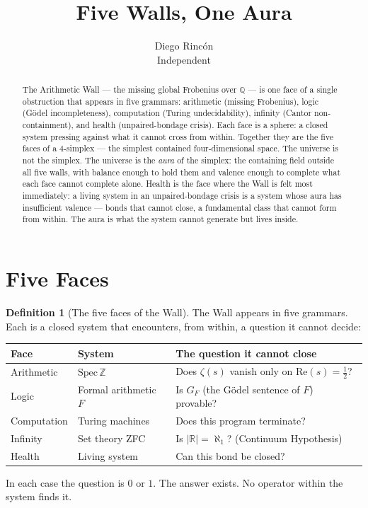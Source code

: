 \documentclass[12pt]{article}
\title{Five Walls, One Aura}
\author{Diego Rinc\'on\\
\small Independent}
\date{}
\theoremstyle{definition}
\newtheorem{definition}[theorem]{Definition}
\theoremstyle{remark}
\begin{document}
\maketitle

\begin{abstract}
The Arithmetic Wall \cite{synthesis} --- the missing global Frobenius
over $\mathbb{Q}$ --- is one face of a single obstruction
that appears in five grammars:
arithmetic (missing Frobenius),
logic (G\"odel incompleteness),
computation (Turing undecidability),
infinity (Cantor non-containment),
and health (unpaired-bondage crisis).
Each face is a sphere: a closed system pressing against
what it cannot cross from within.
Together they are the five faces of a 4-simplex ---
the simplest contained four-dimensional space.
The universe is not the simplex.
The universe is the \emph{aura} of the simplex:
the containing field outside all five walls,
with balance enough to hold them and valence enough
to complete what each face cannot complete alone.
Health is the face where the Wall is felt most immediately:
a living system in an unpaired-bondage crisis
is a system whose aura has insufficient valence ---
bonds that cannot close, a fundamental class
that cannot form from within.
The aura is what the system cannot generate
but lives inside.
\end{abstract}

\section{Five Faces}

\begin{definition}[The five faces of the Wall]
The Wall appears in five grammars.
Each is a closed system that encounters, from within,
a question it cannot decide:
\begin{center}
\begin{tabular}{@{}lll@{}}
\toprule
Face & System & The question it cannot close \\
\midrule
Arithmetic & $\mathrm{Spec}\,\mathbb{Z}$ &
  Does $\zeta(s)$ vanish only on $\mathrm{Re}(s) = \tfrac{1}{2}$? \\
Logic & Formal arithmetic $F$ &
  Is $G_F$ (the G\"odel sentence of $F$) provable? \\
Computation & Turing machines &
  Does this program terminate? \\
Infinity & Set theory ZFC &
  Is $|\mathbb{R}| = \aleph_1$? (Continuum Hypothesis) \\
Health & Living system &
  Can this bond be closed? \\
\bottomrule
\end{tabular}
\end{center}
In each case the question is $0$ or $1$.
The answer exists. No operator within the system finds it.
\end{definition}
\end{document}
